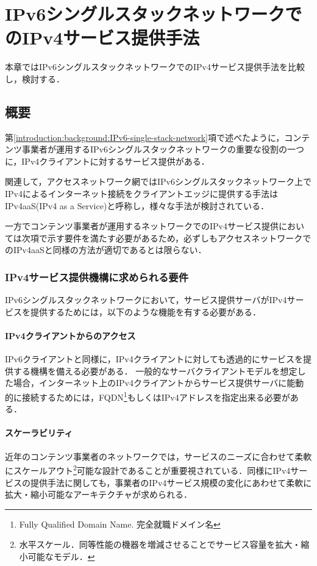 \chapter{IPv6シングルスタックネットワークでのIPv4サービス提供手法}
\label{related}
本章ではIPv6シングルスタックネットワークでのIPv4サービス提供手法を比較し，検討する．


\section{概要}
\label{related:abstract}


第\ref{introduction:background:IPv6-single-stack-network}項で述べたように，コンテンツ事業者が運用するIPv6シングルスタックネットワークの重要な役割の一つに，IPv4クライアントに対するサービス提供がある．

関連して，アクセスネットワーク網ではIPv6シングルスタックネットワーク上でIPv4によるインターネット接続をクライアントエッジに提供する手法はIPv4aaS(IPv4 as a Service)と呼称し，様々な手法が検討されている\cite{RFC8585}．

一方でコンテンツ事業者が運用するネットワークでのIPv4サービス提供においては次項で示す要件を満たす必要があるため，必ずしもアクセスネットワークでのIPv4aaSと同様の方法が適切であるとは限らない．

\subsection{IPv4サービス提供機構に求められる要件}
\label{related:abstract:requirements}
IPv6シングルスタックネットワークにおいて，サービス提供サーバがIPv4サービスを提供するためには，以下のような機能を有する必要がある．

\subsubsection{IPv4クライアントからのアクセス}
IPv6クライアントと同様に，IPv4クライアントに対しても透過的にサービスを提供する機構を備える必要がある．
一般的なサーバクライアントモデルを想定した場合，インターネット上のIPv4クライアントからサービス提供サーバに能動的に接続するためには，FQDN\footnote{Fully Qualified Domain Name. 完全就職ドメイン名}もしくはIPv4アドレスを指定出来る必要がある．


\subsubsection{スケーラビリティ}
近年のコンテンツ事業者のネットワークでは，サービスのニーズに合わせて柔軟にスケールアウト\footnote{水平スケール．同等性能の機器を増減させることでサービス容量を拡大・縮小可能なモデル．}可能な設計であることが重要視されている\cite{5550998}．同様にIPv4サービスの提供手法に関しても，事業者のIPv4サービス規模の変化にあわせて柔軟に拡大・縮小可能なアーキテクチャが求められる．

